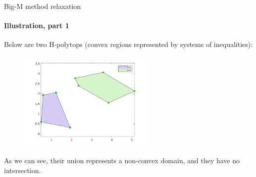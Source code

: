 \documentclass{beamer}
\begin{document}
\begin{frame}{Big-M method relaxation}
\framesubtitle{Illustration, part 1}
\begin{flushleft}

Below are two H-polytops (convex regions represented by systems of inequalities):

\begin{figure} [h!]
\begin{center}
\includegraphics[width=2.6in]{fig1.png}
\end{center} 
\end{figure}

As we can see, their union represents a non-convex domain, and they have no intersection.

\end{flushleft}
\end{frame}
\end{document}

